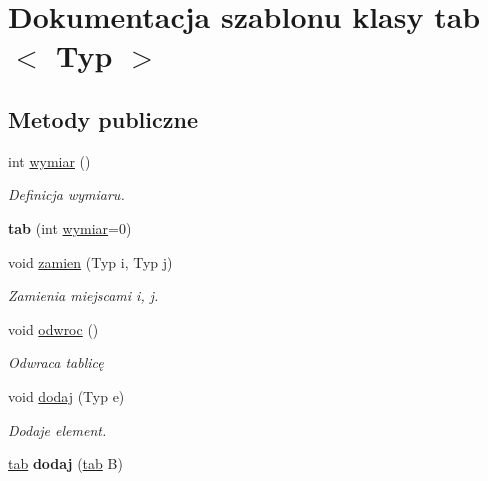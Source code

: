 \hypertarget{classtab}{\section{\-Dokumentacja szablonu klasy tab$<$ \-Typ $>$}
\label{classtab}
}
\subsection*{\-Metody publiczne}
\begin{DoxyCompactItemize}
\item 
\hypertarget{classtab_aedffa47955ffaea9876790a5fdbd9562}{int \hyperlink{classtab_aedffa47955ffaea9876790a5fdbd9562}{wymiar} ()}\label{classtab_aedffa47955ffaea9876790a5fdbd9562}

\begin{DoxyCompactList}\small\item\em \-Definicja wymiaru. \end{DoxyCompactList}\item 
\hypertarget{classtab_a36068a968872b0263096a9719a2ad5bb}{{\bfseries tab} (int \hyperlink{classtab_aedffa47955ffaea9876790a5fdbd9562}{wymiar}=0)}\label{classtab_a36068a968872b0263096a9719a2ad5bb}

\item 
void \hyperlink{classtab_a47d35ab4fd1e07333de71f9eb4b7fab2}{zamien} (\-Typ i, \-Typ j)
\begin{DoxyCompactList}\small\item\em \-Zamienia miejscami i, j. \end{DoxyCompactList}\item 
void \hyperlink{classtab_a3892398e71e9d23417c8dce1b1ba852f}{odwroc} ()
\begin{DoxyCompactList}\small\item\em \-Odwraca tablicę \end{DoxyCompactList}\item 
\hypertarget{classtab_a5abb6bb51a476b922d00f8f3e8615f24}{void \hyperlink{classtab_a5abb6bb51a476b922d00f8f3e8615f24}{dodaj} (\-Typ e)}\label{classtab_a5abb6bb51a476b922d00f8f3e8615f24}

\begin{DoxyCompactList}\small\item\em \-Dodaje element. \end{DoxyCompactList}\item 
\hypertarget{classtab_a39edfcc37ce6fc7d6bd27f0555c2d50b}{\hyperlink{classtab}{tab} {\bfseries dodaj} (\hyperlink{classtab}{tab} \-B)}\label{classtab_a39edfcc37ce6fc7d6bd27f0555c2d50b}


\end{DoxyCompactItemize}
